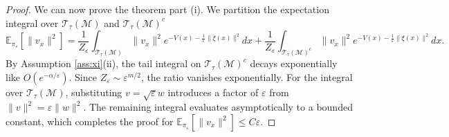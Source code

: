 \documentclass[12pt]{article}
\begin{document}
\begin{proof}
We can now prove the theorem part (i). We partition the expectation integral over $\mathcal{T}_\tau(\mathcal{M})$ and $\mathcal{T}_\tau(\mathcal{M})^c$
$$\mathbb{E}_{\pi_\varepsilon}[\|v_x\|^2] = \frac{1}{Z_\varepsilon} \int_{\mathcal{T}_\tau(\mathcal{M})} \|v_x\|^2 e^{-V(x) - \frac{1}{\varepsilon}\|\xi(x)\|^2} dx + \frac{1}{Z_\varepsilon} \int_{\mathcal{T}_\tau(\mathcal{M})^c} \|v_x\|^2 e^{-V(x) - \frac{1}{\varepsilon}\|\xi(x)\|^2} dx.$$
By Assumption \ref{ass:xi}(ii), the tail integral on $\mathcal{T}_\tau(\mathcal{M})^c$ decays exponentially like $O(e^{-\alpha/\varepsilon})$. Since $Z_\varepsilon \sim \varepsilon^{m/2}$, the ratio vanishes exponentially. For the integral over $\mathcal{T}_\tau(\mathcal{M})$, substituting $v = \sqrt{\varepsilon}w$ introduces a factor of $\varepsilon$ from $\|v\|^2 = \varepsilon\|w\|^2$. The remaining integral evaluates asymptotically to a bounded constant, which completes the proof for $\mathbb{E}_{\pi_\varepsilon}[\|v_x\|^2] \le C\varepsilon$.


\end{proof}
\end{document}
